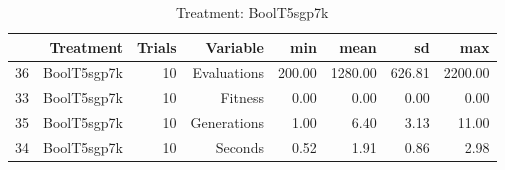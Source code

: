 \begin{table}[ht]
\centering
\begin{tabular}{rrrrrrrr}
  \hline
 & Treatment & Trials & Variable & min & mean & sd & max \\ 
  \hline
36 & BoolT5sgp7k &  10 & Evaluations & 200.00 & 1280.00 & 626.81 & 2200.00 \\ 
  33 & BoolT5sgp7k &  10 & Fitness & 0.00 & 0.00 & 0.00 & 0.00 \\ 
  35 & BoolT5sgp7k &  10 & Generations & 1.00 & 6.40 & 3.13 & 11.00 \\ 
  34 & BoolT5sgp7k &  10 & Seconds & 0.52 & 1.91 & 0.86 & 2.98 \\ 
   \hline
\end{tabular}
\caption{Treatment: BoolT5sgp7k} 
\end{table}
